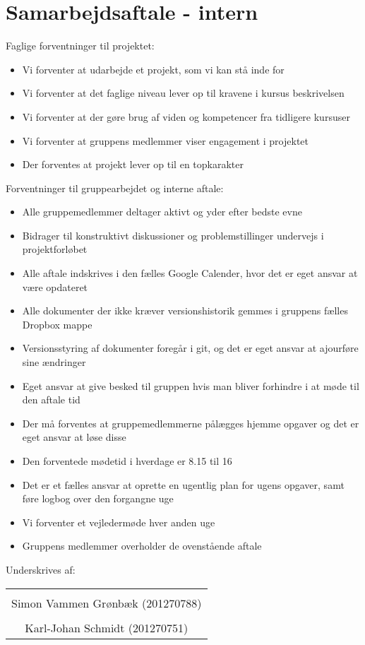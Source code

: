 \section{Samarbejdsaftale - intern}

Faglige forventninger til projektet:
\begin{itemize}
	\item Vi forventer at udarbejde et projekt, som vi kan stå inde for
	\item Vi forventer at det faglige niveau lever op til kravene i kursus beskrivelsen
	\item Vi forventer at der gøre brug af viden og kompetencer fra tidligere kursuser
	\item Vi forventer at gruppens medlemmer viser engagement i projektet
	\item Der forventes at projekt lever op til en topkarakter
\end{itemize}

Forventninger til gruppearbejdet og interne aftale:
\begin{itemize}
	\item Alle gruppemedlemmer deltager aktivt og yder efter bedste evne
	\item Bidrager til konstruktivt diskussioner og problemstillinger undervejs i projektforløbet
	\item Alle aftale indskrives i den fælles Google Calender, hvor det er eget ansvar at være opdateret
	\item Alle dokumenter der ikke kræver versionshistorik gemmes i gruppens fælles Dropbox mappe
	\item Versionsstyring af dokumenter foregår i git, og det er eget ansvar at ajourføre sine ændringer
	\item Eget ansvar at give besked til gruppen hvis man bliver forhindre i at møde til den aftale tid
	\item Der må forventes at gruppemedlemmerne pålægges hjemme opgaver og det er eget ansvar at løse disse
	\item Den forventede mødetid i hverdage er 8.15 til 16
	\item Det er et fælles ansvar at oprette en ugentlig plan for ugens opgaver, samt føre logbog over den forgangne uge	
	\item Vi forventer et vejledermøde hver anden uge
	\item Gruppens medlemmer overholder de ovenstående aftale
\end{itemize}

Underskrives af: 
\begin{table}[H]
	\centering
	\begin{tabular}{c}
		\underline{\phantom{mmmmmmmmmmmmmm}}  \\
		Simon Vammen Grønbæk (201270788) \vspace{2cm}\\
		\underline{\phantom{mmmmmmmmmmmmmm}} \\
		Karl-Johan Schmidt (201270751)\vspace{2cm}	\\
	\end{tabular}
\end{table}


